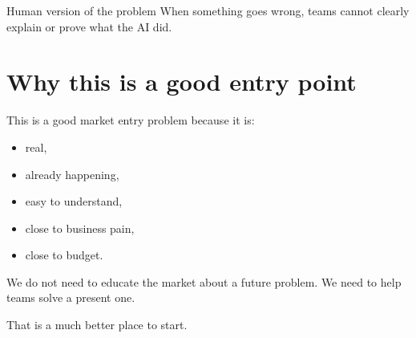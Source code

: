 \begin{dangerbox}{Human version of the problem}
When something goes wrong, teams cannot clearly explain or prove what the AI did.
\end{dangerbox}

\section{Why this is a good entry point}

This is a good market entry problem because it is:

\begin{itemize}
  \item real,
  \item already happening,
  \item easy to understand,
  \item close to business pain,
  \item close to budget.
\end{itemize}

We do not need to educate the market about a future problem.
We need to help teams solve a present one.

That is a much better place to start.
